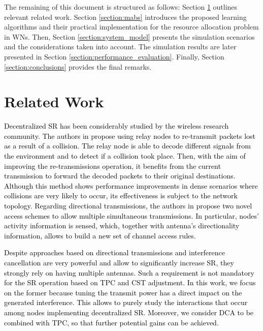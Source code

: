 \documentclass{article}
\begin{document}
	The remaining of this document is structured as follows: Section \ref{section:related_work} outlines relevant related work. Section \ref{section:mabs} introduces the proposed learning algorithms and their practical implementation for the resource allocation problem in WNs. Then, Section \ref{section:system_model} presents the simulation scenarios and the considerations taken into account. The simulation results are later presented in Section \ref{section:performance_evaluation}. Finally, Section \ref{section:conclusions} provides the final remarks.
	
	\section{Related Work}
	\label{section:related_work} 
	
	\textcolor{black}{Decentralized SR has been considerably studied by the wireless research community. The authors in \cite{argyriou2010collision} propose using relay nodes to re-transmit packets lost as a result of a collision. The relay node is able to decode different signals from the environment and to detect if a collision took place. Then, with the aim of improving the re-transmissions operation, it benefits from the current transmission to forward the decoded packets to their original destinations. Although this method shows performance improvements in dense scenarios where collisions are very likely to occur, its effectiveness is subject to the network topology. Regarding directional transmissions, the authors in \cite{babich2015design} propose two novel access schemes to allow multiple simultaneous transmissions. In particular, nodes' activity information is sensed, which, together with antenna's directionality information, allows to build a new set of channel access rules.}
	
	\textcolor{black}{Despite approaches based on directional transmissions and interference cancellation are very powerful and allow to significantly increase SR, they strongly rely on having multiple antennas. Such a requirement is not mandatory for the SR operation based on TPC and CST adjustment. In this work, we focus on the former because tuning the transmit power has a direct impact on the generated interference. This allows to purely study the interactions that occur among nodes implementing decentralized SR. Moreover, we consider DCA to be combined with TPC, so that further potential gains can be achieved.}
	
\end{document}

